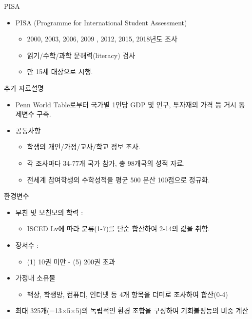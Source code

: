 \documentclass[handout, 10pt]{beamer}
\begin{document}
\begin{frame}{PISA}
    \begin{itemize}
         \item PISA (Programme for International Student Assessment)
        \begin{itemize}
            \item 2000, 2003, 2006, 2009 , 2012, 2015, 2018년도 조사
            \item 읽기/수학/과학 문해력(literacy) 검사
            \item 만 15세 대상으로 시행.
        \end{itemize}
    \end{itemize}
\end{frame}

\begin{frame}{추가 자료설명}
    \begin{itemize}
        \item Penn World Table로부터 국가별 1인당 GDP 및 인구, 투자재의 가격 등 거시 통제변수 구축.
        \item 공통사항
        \begin{itemize}
            \item 학생의 개인/가정/교사/학교 정보 조사.
            \item 각 조사마다 34-77개 국가 참가, 총 98개국의 성적 자료.
            \item 전세계 참여학생의 수학성적을 평균 500 분산 100점으로 정규화.
        \end{itemize}
    \end{itemize}
\end{frame}

\begin{frame}{환경변수}
    \begin{itemize}
    \item 부친 및 모친모의 학력 :
    \begin{itemize}
        \item ISCED Lv에 따라 분류(1-7)를 단순 합산하여 2-14의 값을 취함.
    \end{itemize}
    \item 장서수 :
    \begin{itemize}
        \item (1) 10권 미만 - (5) 200권 초과
    \end{itemize}
    \item 가정내 소유물
    \begin{itemize}
        \item 책상, 학생방, 컴퓨터, 인터넷 등 4개 항목을 더미로 조사하여 합산(0-4)
    \end{itemize}
    \item 최대 325개(=13$\times$5$\times$5)의 독립적인 환경 조합을 구성하여 기회불평등의 비중 계산
    \end{itemize}
\end{frame}
\end{document}
